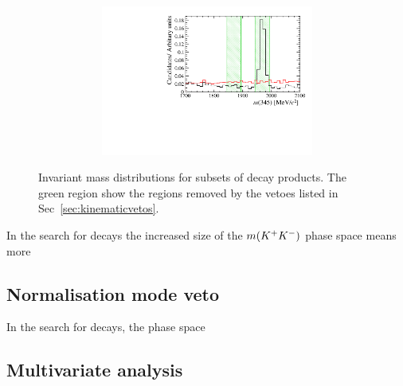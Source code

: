 \begin{figure}[!h]
\begin{subfigure}[t]{1.0\textwidth}
\begin{subfigure}[t]{0.32\textwidth}
         \includegraphics[width=1.0\textwidth]{figs/Selection/Veto_Comparison_B2DsPhi_Ds2KPiPi_m345.pdf}
      \end{subfigure}
      \caption{\decay{\Bp}{(\decay{\Dsp}{\Kp\pim\pip})\phiz}}
   \end{subfigure}

   \caption{Invariant mass distributions for subsets of decay products. The green region show the regions removed by the vetoes listed in Sec~\ref{sec:kinematicvetos}.}
   \label{fig:invariantmassvetoes}   
\end{figure}



In the search for \decay{\Bp}{\Dsp\Kp\Km} decays the increased size of the $m({{K}^+}{{K}^-})$ phase space means more 



\subsection{Normalisation mode veto}
\label{sec:normvetos}

In the search for \decay{\Bp}{\Dsp\Kp\Km} decays, the phase space 

\subsection{Multivariate analysis}

